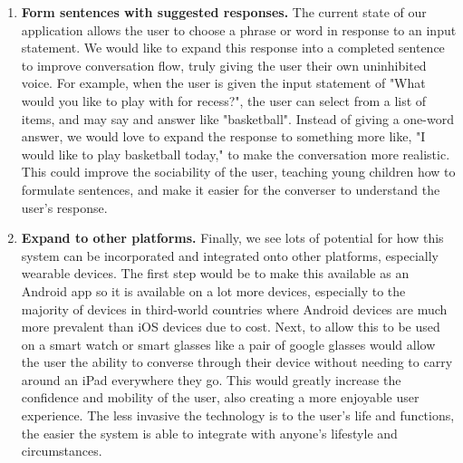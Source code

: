 \begin{enumerate}
	\item \textbf{Form sentences with suggested responses.} The current state of our application allows the user to choose a phrase or word in response to an input statement. We would like to expand this response into a completed sentence to improve conversation flow, truly giving the user their own uninhibited voice. For example, when the user is given the input statement of "What would you like to play with for recess?", the user can select from a list of items, and may say and answer like "basketball". Instead of giving a one-word answer, we would love to expand the response to something more like, "I would like to play basketball today," to make the conversation more realistic. This could improve the sociability of the user, teaching young children how to formulate sentences, and make it easier for the converser to understand the user's response.
	\item \textbf{Expand to other platforms.} Finally, we see lots of potential for how this system can be incorporated and integrated onto other platforms, especially wearable devices. The first step would be to make this available as an Android app so it is available on a lot more devices, especially to the majority of devices in third-world countries where Android devices are much more prevalent than iOS devices due to cost. Next, to allow this to be used on a smart watch or smart glasses like a pair of google glasses would allow the user the ability to converse through their device without needing to carry around an iPad everywhere they go. This would greatly increase the confidence and mobility of the user, also creating a more enjoyable user experience. The less invasive the technology is to the user's life and functions, the easier the system is able to integrate with anyone's lifestyle and circumstances.
\end{enumerate}
